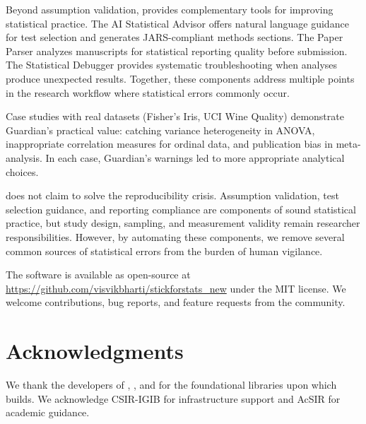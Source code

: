 \documentclass[article]{jss}
\begin{document}
Beyond assumption validation,  provides complementary tools for improving statistical practice. The AI Statistical Advisor offers natural language guidance for test selection and generates JARS-compliant methods sections. The Paper Parser analyzes manuscripts for statistical reporting quality before submission. The Statistical Debugger provides systematic troubleshooting when analyses produce unexpected results. Together, these components address multiple points in the research workflow where statistical errors commonly occur.

Case studies with real datasets (Fisher's Iris, UCI Wine Quality) demonstrate Guardian's practical value: catching variance heterogeneity in ANOVA, inappropriate correlation measures for ordinal data, and publication bias in meta-analysis. In each case, Guardian's warnings led to more appropriate analytical choices.

 does not claim to solve the reproducibility crisis. Assumption validation, test selection guidance, and reporting compliance are components of sound statistical practice, but study design, sampling, and measurement validity remain researcher responsibilities. However, by automating these components, we remove several common sources of statistical errors from the burden of human vigilance.

The software is available as open-source at \url{https://github.com/visvikbharti/stickforstats_new} under the MIT license. We welcome contributions, bug reports, and feature requests from the community.


\section*{Acknowledgments}

We thank the developers of , , and  for the foundational libraries upon which  builds. We acknowledge CSIR-IGIB for infrastructure support and AcSIR for academic guidance.



\end{document}
